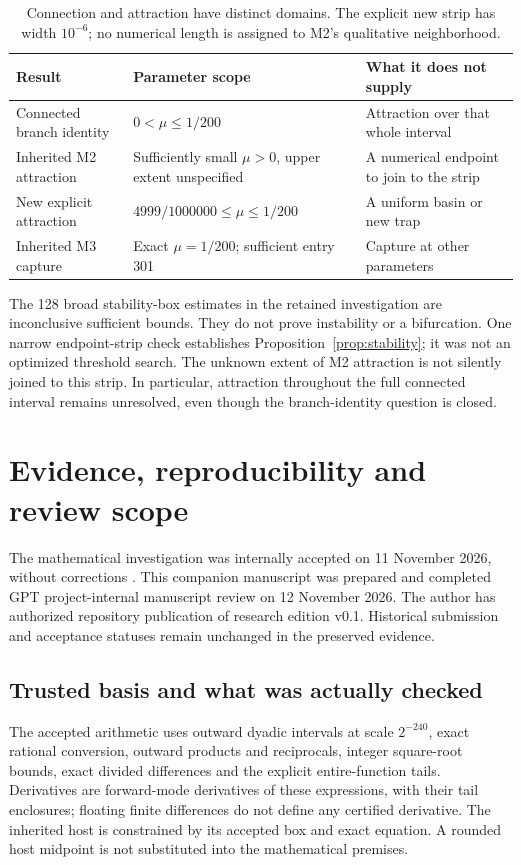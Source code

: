 \documentclass[11pt,a4paper]{article}
\numberwithin{equation}{section}
\begin{document}
\begin{table}[htbp]\centering\small
\begin{tabular}{P{.28\linewidth}P{.32\linewidth}P{.30\linewidth}}\toprule
Result & Parameter scope & What it does not supply\\\midrule
Connected branch identity & $0<\mu\le1/200$ & Attraction over that whole interval\\
Inherited M2 attraction & Sufficiently small $\mu>0$, upper extent unspecified & A numerical endpoint to join to the strip\\
New explicit attraction & $4999/1000000\le\mu\le1/200$ & A uniform basin or new trap\\
Inherited M3 capture & Exact $\mu=1/200$; sufficient entry 301 & Capture at other parameters\\\bottomrule
\end{tabular}
\caption{Connection and attraction have distinct domains. The explicit new strip has width $10^{-6}$; no numerical length is assigned to M2's qualitative neighborhood.}\label{tab:stability-scope}
\end{table}

The 128 broad stability-box estimates in the retained investigation are inconclusive sufficient bounds. They do not prove instability or a bifurcation. One narrow endpoint-strip check establishes Proposition~\ref{prop:stability}; it was not an optimized threshold search. The unknown extent of M2 attraction is not silently joined to this strip. In particular, attraction throughout the full connected interval remains unresolved, even though the branch-identity question is closed.

\section{Evidence, reproducibility and review scope}\label{sec:evidence}
The mathematical investigation was internally accepted on 11 November 2026, without corrections \cite{Review}. This companion manuscript was prepared and completed GPT project-internal manuscript review on 12 November 2026. The author has authorized repository publication of research edition v0.1. Historical submission and acceptance statuses remain unchanged in the preserved evidence.

\subsection{Trusted basis and what was actually checked}\label{sec:trust}
The accepted arithmetic uses outward dyadic intervals at scale $2^{-240}$, exact rational conversion, outward products and reciprocals, integer square-root bounds, exact divided differences and the explicit entire-function tails. Derivatives are forward-mode derivatives of these expressions, with their tail enclosures; floating finite differences do not define any certified derivative. The inherited host is constrained by its accepted box and exact equation. A rounded host midpoint is not substituted into the mathematical premises.
\end{document}
